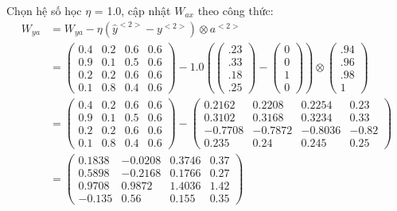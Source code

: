 Chọn hệ số học $\eta$ = 1.0, cập nhật $W_{ax}$ theo công thức:\\
\begin{equation*}
    \begin{split}
    W_{ya} & = W_{ya} - \eta (\widehat{y}^{<2>} - y^{<2>}) \otimes a^{<2>} \\
     & = \begin{pmatrix}0.4 & 0.2 & 0.6 & 0.6\\0.9 & 0.1 & 0.5 & 0.6\\ 0.2 & 0.2 & 0.6 & 0.6 \\0.1 & 0.8 & 0.4 & 0.6\end{pmatrix} - 1.0 (\begin{pmatrix}.23\\.33\\.18\\.25 \end{pmatrix}-
    \begin{pmatrix}0\\0\\1\\0\end{pmatrix}) \otimes \begin{pmatrix}.94\\.96\\.98\\1 \end{pmatrix} \\
     & = \begin{pmatrix}0.4 & 0.2 & 0.6 & 0.6\\0.9 & 0.1 & 0.5 & 0.6\\ 0.2 & 0.2 & 0.6 & 0.6 \\0.1 & 0.8 & 0.4 & 0.6\end{pmatrix} - \begin{pmatrix}0.2162 & 0.2208 & 0.2254 & 0.23\\0.3102 & 0.3168 & 0.3234 & 0.33\\ -0.7708 & -0.7872 & -0.8036 & -0.82 \\0.235 & 0.24 & 0.245 & 0.25 \end{pmatrix} \\
     & = \begin{pmatrix}0.1838 & -0.0208 & 0.3746 & 0.37\\0.5898 & -0.2168 & 0.1766 & 0.27\\ 0.9708 & 0.9872 & 1.4036 & 1.42 \\-0.135 & 0.56 & 0.155 & 0.35 \end{pmatrix}
    \end{split}
\end{equation*}

